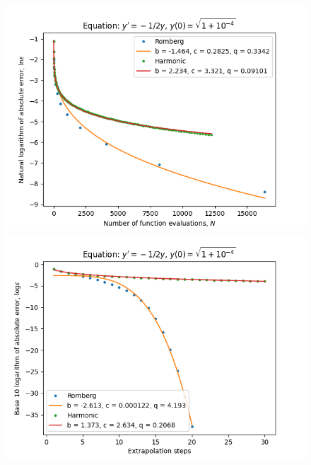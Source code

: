 \begin{figure}[H]
\centering
\begin{minipage}{0.45\textwidth}
\centering
\includegraphics[scale=0.45]{emr_plots/quad_sing_4_hp_trend.png}
\end{minipage}
\begin{minipage}{0.45\textwidth}
\centering
\includegraphics[scale=0.45]{emr_plots/quad_sing_4_hp_steps.png}
\end{minipage}
\end{figure}

